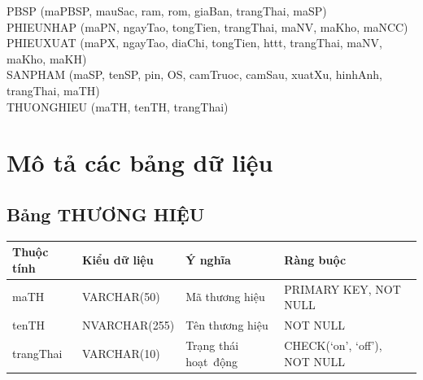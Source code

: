 \documentclass[a4paper,12pt]{report}
\begin{document}
PBSP (maPBSP, mauSac, ram, rom, giaBan, trangThai, maSP)\\

PHIEUNHAP (maPN, ngayTao, tongTien, trangThai, maNV, maKho, maNCC)\\

PHIEUXUAT (maPX, ngayTao, diaChi, tongTien, httt, trangThai, maNV, maKho, maKH)\\

SANPHAM (maSP, tenSP, pin, OS, camTruoc, camSau, xuatXu, hinhAnh, trangThai, maTH)\\

THUONGHIEU (maTH, tenTH, trangThai)\\

\section{Mô tả các bảng dữ liệu}
\subsection{Bảng THƯƠNG HIỆU}
\noindent
\begin{center}
    \begin{tabular}{|>{\centering\arraybackslash}p{3cm}|
        >{\centering\arraybackslash}p{4cm}|
        >{\centering\arraybackslash}p{4cm}|
        >{\centering\arraybackslash}p{4cm}|}
        \hline
        \textbf{Thuộc tính}                                                                                                               &
        \textbf{Kiểu dữ liệu}                                                                                                                             &
        \textbf{Ý nghĩa}                                                                                                 &
        \textbf{Ràng buộc}                                                                                                         \\
        \hline
        maTH &  VARCHAR(50)  & Mã thương hiệu & PRIMARY KEY, NOT NULL \\
        \hline
        tenTH &  NVARCHAR(255)  & Tên thương hiệu & NOT NULL \\                                                                                                                          
        \hline
        trangThai &  VARCHAR(10)  & Trạng thái hoạt~động & CHECK(‘on’, ‘off’), NOT NULL \\
        \hline
    \end{tabular}
\end{center}
\end{document}
